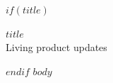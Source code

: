 \documentclass[11pt]{article}
\begin{document}
$if(title)$
\begin{center}
{\LARGE \textbf{$title$}}\\[6pt]
{\small Living product updates}
\end{center}
\vspace{8pt}
$endif$
$body$
\end{document}
